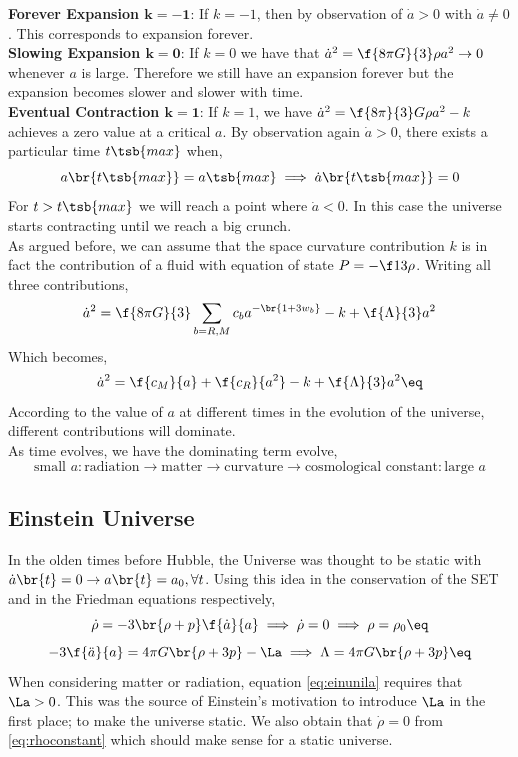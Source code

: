 \documentclass{article}
\begin{document}
\textbf{Forever Expansion $\mathbf{k = -1}$}: If $k=-1$, then by observation of $\dot{a} > 0$ with $\dot{a} \neq 0$. This corresponds to expansion forever.\\

\textbf{Slowing Expansion $\mathbf{k = 0}$}: If $k = 0$ we have that $\dot{a}^2 = \f{8 \pi G}{3} \rho a^2 \to 0$ whenever $a$ is large. Therefore we still have an expansion forever but the expansion becomes slower and slower with time.\\

\textbf{Eventual Contraction $\mathbf{k = 1}$}: If $k=1$, we have $\dot{a}^2 = \f{8\pi}{3}G \rho a^2 - k$ achieves a zero value at a critical $a$. By observation again $\dot{a} > 0$, there exists a particular time $t\tsb{max}$ when,
\[ a\br{t\tsb{max}} = a\tsb{max}  \implies \dot{a}\br{t\tsb{max}} = 0 \]
For $t > t\tsb{max} $ we will reach a point where $\dot{a} < 0$. In this case the universe starts contracting until we reach a big crunch.\\

As argued before, we can assume that the space curvature contribution $k$ is in fact the contribution of a fluid with equation of state $P = -\f13 \rho$. Writing all three contributions,
\[ \dot{a}^2 = \f{8\pi G}{3}\sum_{b=R,M}c_b a^{-\br{1 + 3 w_b}} - k + \f{\Lambda}{3}a^2 \]
Which becomes,
\[ \dot{a}^2 = \f{c_M}{a} + \f{c_R}{a^2} - k + \f{\Lambda}{3}a^2 \eq \label{eq:add} \]
According to the value of $a$ at different times in the evolution of the universe, different contributions will dominate. \\

As time evolves, we have the dominating term evolve,
\[ \text{small } a : \text{radiation} \to \text{matter} \to \text{curvature} \to \text{cosmological constant} : \text{large } a \]
\subsection{Einstein Universe}
In the olden times before Hubble, the Universe was thought to be static with $\dot{a}\br{t} = 0 \to a\br{t} = a_0, \forall t$. Using this idea in the conservation of the SET and in the Friedman equations respectively,
\[ \dot{\rho} = - 3 \br{\rho + p}\f{\dot{a}}{a} \implies \dot{\rho} = 0 \implies \rho = \rho_0 \eq \label{eq:rhoconstant}\]
\[ -3\f{\ddot{a}}{a} = 4 \pi G \br{\rho + 3p} - \La \implies \Lambda = 4 \pi G \br{\rho + 3 p} \eq \label{eq:einunila} \]
When considering matter or radiation, equation \eqref{eq:einunila} requires that $\La > 0$. This was the source of Einstein's motivation to introduce $\La$ in the first place; to make the universe static. We also obtain that $\dot{\rho} = 0$ from \eqref{eq:rhoconstant} which should make sense for a static universe. \\
\end{document}
